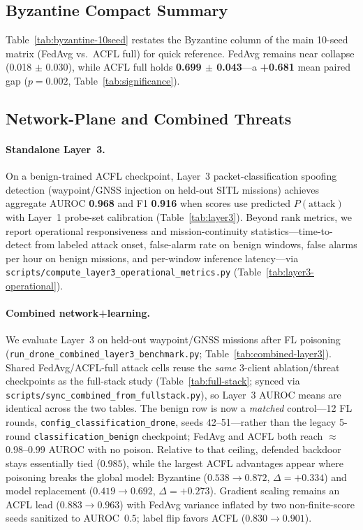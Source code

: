 \subsection{Byzantine Compact Summary}
\label{sec:exp-byz-10seed}

Table~\ref{tab:byzantine-10seed} restates the Byzantine column of the main 10-seed matrix (FedAvg vs.\ ACFL full) for quick reference.
FedAvg remains near collapse (0.018 $\pm$ 0.030), while ACFL full holds \textbf{0.699 $\pm$ 0.043}---a \textbf{+0.681} mean paired gap ($p{=}0.002$, Table~\ref{tab:significance}).

\subsection{Network-Plane and Combined Threats}
\label{sec:exp-network-combined}

\paragraph{Standalone Layer~3.}
On a benign-trained ACFL checkpoint, Layer~3 packet-classification spoofing detection (waypoint/GNSS injection on held-out SITL missions) achieves aggregate AUROC \textbf{0.968} and F1 \textbf{0.916} when scores use predicted $P(\text{attack})$ with Layer~1 probe-set calibration (Table~\ref{tab:layer3}).
Beyond rank metrics, we report operational responsiveness and mission-continuity statistics---time-to-detect from labeled attack onset, false-alarm rate on benign windows, false alarms per hour on benign missions, and per-window inference latency---via \texttt{scripts/compute\_layer3\_operational\_metrics.py} (Table~\ref{tab:layer3-operational}).


\paragraph{Combined network+learning.}
We evaluate Layer~3 on held-out waypoint/GNSS missions after FL poisoning (\texttt{run\_drone\_combined\_layer3\_benchmark.py}; Table~\ref{tab:combined-layer3}).
Shared FedAvg/ACFL-full attack cells reuse the \emph{same} 3-client ablation/threat checkpoints as the full-stack study (Table~\ref{tab:full-stack}; synced via \texttt{scripts/sync\_combined\_from\_fullstack.py}), so Layer~3 AUROC means are identical across the two tables.
The benign row is now a \emph{matched} control---12 FL rounds, \texttt{config\_classification\_drone}, seeds 42--51---rather than the legacy 5-round \texttt{classification\_benign} checkpoint; FedAvg and ACFL both reach $\approx$0.98--0.99 AUROC with no poison.
Relative to that ceiling, defended backdoor stays essentially tied ($0.985$), while the largest ACFL advantages appear where poisoning breaks the global model: Byzantine ($0.538 \to 0.872$, $\Delta{=}{+}0.334$) and model replacement ($0.419 \to 0.692$, $\Delta{=}{+}0.273$).
Gradient scaling remains an ACFL lead ($0.883 \to 0.963$) with FedAvg variance inflated by two non-finite-score seeds sanitized to AUROC~$0.5$; label flip favors ACFL ($0.830 \to 0.901$).

